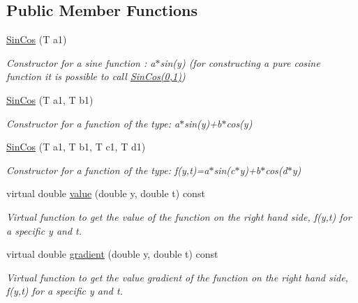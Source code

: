 \subsection*{Public Member Functions}
\begin{DoxyCompactItemize}
\item 
\hypertarget{class_sin_cos_a3cac71427371707bdab285bdd397aa3d}{}\hyperlink{class_sin_cos_a3cac71427371707bdab285bdd397aa3d}{Sin\+Cos} (T a1)\label{class_sin_cos_a3cac71427371707bdab285bdd397aa3d}

\begin{DoxyCompactList}\small\item\em Constructor for a sine function \+: a$\ast$sin(y) (for constructing a pure cosine function it is possible to call \hyperlink{class_sin_cos}{Sin\+Cos(0,1)}) \end{DoxyCompactList}\item 
\hypertarget{class_sin_cos_a64e4afd2a47fa1375b101b2e439be409}{}\hyperlink{class_sin_cos_a64e4afd2a47fa1375b101b2e439be409}{Sin\+Cos} (T a1, T b1)\label{class_sin_cos_a64e4afd2a47fa1375b101b2e439be409}

\begin{DoxyCompactList}\small\item\em Constructor for a function of the type\+: a$\ast$sin(y)+b$\ast$cos(y) \end{DoxyCompactList}\item 
\hypertarget{class_sin_cos_a922f7496fd03a8429fd96e29ba21fa64}{}\hyperlink{class_sin_cos_a922f7496fd03a8429fd96e29ba21fa64}{Sin\+Cos} (T a1, T b1, T c1, T d1)\label{class_sin_cos_a922f7496fd03a8429fd96e29ba21fa64}

\begin{DoxyCompactList}\small\item\em Constructor for a function of the type\+: f(y,t)=a$\ast$sin(c$\ast$y)+b$\ast$cos(d$\ast$y) \end{DoxyCompactList}\item 
\hypertarget{class_sin_cos_a2ccce937dae380440f1278f8c0f5801c}{}virtual double \hyperlink{class_sin_cos_a2ccce937dae380440f1278f8c0f5801c}{value} (double y, double t) const \label{class_sin_cos_a2ccce937dae380440f1278f8c0f5801c}

\begin{DoxyCompactList}\small\item\em Virtual function to get the value of the function on the right hand side, f(y,t) for a specific y and t. \end{DoxyCompactList}\item 
\hypertarget{class_sin_cos_abed60e185e8838cf409613152af45ee9}{}virtual double \hyperlink{class_sin_cos_abed60e185e8838cf409613152af45ee9}{gradient} (double y, double t) const \label{class_sin_cos_abed60e185e8838cf409613152af45ee9}

\begin{DoxyCompactList}\small\item\em Virtual function to get the value gradient of the function on the right hand side, f\textquotesingle{}(y,t) for a specific y and t. \end{DoxyCompactList}\end{DoxyCompactItemize}


